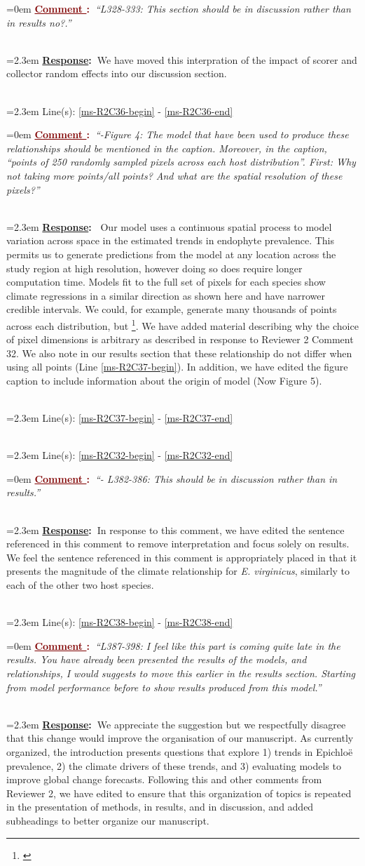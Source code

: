\documentclass[12pt]{article}
\newcounter{cN}
\newcommand{\comment}[1]{
	\vspace{2em}
	\refstepcounter{cN} %
	\noindent \hangindent=0em \textbf{\textcolor{Maroon}{\uline{Comment \thecN}:~}}\emph{``#1''}
	}
\newcommand{\response}[1]{
	\\[0.25em]
	\hangindent=2.3em \textbf{\textcolor{NavyBlue}{\uline{Response}:~}}#1
	}
\newcommand{\linesref}[2]{
		\\[0.25em]
	\hangindent=2.3em {\color{Mahogany} Line(s): \ref{#1} - \ref{#2}}
}
\newcommand{\tom}[2]{{\color{red}{#1}}\footnote{\textit{\color{red}{#2}}}}
\begin{document}
\comment{L328-333: This section should be in discussion rather than in results no?.}
\response{We have moved this interpration of the impact of scorer and collector random effects into our discussion section.}
\linesref{ms-R2C36-begin}{ms-R2C36-end}


\comment{-Figure 4: The model that have been used to produce these relationships should be mentioned in the caption. Moreover, in the caption, “points of 250 randomly sampled pixels across each host distribution”. First: Why not taking more points/all points? And what are the spatial resolution of these pixels?}
\response{ Our model uses a continuous spatial process to model variation across space in the estimated trends in endophyte prevalence. This permits us to generate predictions from the model at any location across the study region at high resolution, however doing so does require longer computation time. Models fit to the full set of pixels for each species show climate regressions in a similar direction as shown here and have narrower credible intervals. We could, for example, generate many thousands of points across each distribution, but \tom{this would make the credible intervals largely meaningless}{By this logic the CIs are meaningless for any sample size, whether its the full range or an arbitrary subset.}. We have added material describing why the choice of pixel dimensions is arbitrary as described in response to Reviewer 2 Comment 32. We also note in our results section that these relationship do not differ when using all points (Line \ref{ms-R2C37-begin}). In addition, we have edited the figure caption to include information about the origin of model (Now Figure 5).}
\linesref{ms-R2C37-begin}{ms-R2C37-end}
\linesref{ms-R2C32-begin}{ms-R2C32-end}

\comment{- L382-386: This should be in discussion rather than in results.}
\response{In response to this comment, we have edited the sentence referenced in this comment to remove interpretation and focus solely on results. We feel the sentence referenced in this comment is appropriately placed in that it presents the magnitude of the climate relationship for \emph{E. virginicus}, similarly to each of the other two host species.}
\linesref{ms-R2C38-begin}{ms-R2C38-end}

\comment{L387-398: I feel like this part is coming quite late in the results. You have already been presented the results of the models, and relationships, I would suggests to move this earlier in the results section. Starting from model performance before to show results produced from this model.}
\response{We appreciate the suggestion but we respectfully disagree that this change would improve the organisation of our manuscript. As currently organized, the introduction presents questions that explore 1) trends in Epichloë prevalence, 2) the climate drivers of these trends, and 3) evaluating models to improve global change forecasts. Following this and other comments from Reviewer 2, we have edited to ensure that this organization of topics is repeated in the presentation of methods, in results, and in discussion, and added subheadings to better organize our manuscript.}
\end{document}
